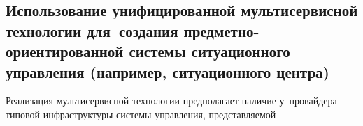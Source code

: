 \begin{multicols}{2}
\vspace*{-6pt}


\section{Использование унифицированной мультисервисной 
технологии для~создания предметно-ориентированной системы 
ситуационного управления (например, ситуационного центра)}

    Реализация мультисервисной технологии предполагает наличие 
у~провайдера типовой инфраструктуры сис\-те\-мы управ\-ле\-ния, 
пред\-став\-ля\-емой\linebreak\vspace*{-12pt}

\pagebreak

\end{multicols}

\begin{figure*} %
\vspace*{1pt}
 \begin{center}
 \mbox{%
 \epsfxsize=126.858mm 
 }
 \end{center}
\vspace*{-9pt}
\end{figure*}

